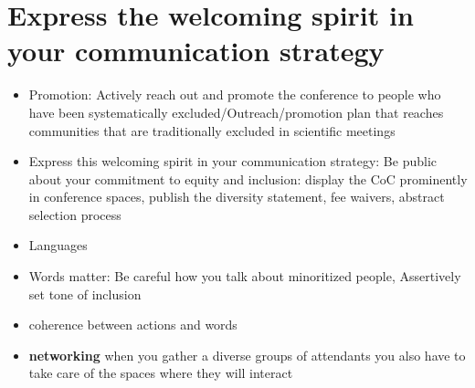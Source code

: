 \documentclass[10pt,letterpaper]{article}
\begin{document}


\section{Express the welcoming spirit in your communication strategy}
\label{rule_communication}

\begin{itemize}
    \item Promotion: Actively reach out and promote the conference to people who have been systematically excluded/Outreach/promotion plan that reaches communities that are traditionally excluded in scientific meetings
    \item Express this welcoming spirit in your communication strategy: Be public about your commitment to equity and inclusion: display the CoC prominently in conference spaces, publish the diversity statement, fee waivers, abstract selection process
    \item Languages
    \item Words matter: Be careful how you talk about minoritized people, Assertively set tone of inclusion
    \item coherence between actions and words
    \item \textbf{networking} when you gather a diverse groups of attendants you also have to take care of the spaces where they will interact
\end{itemize}
\end{document}
